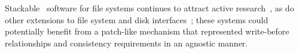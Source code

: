 


Stackable \module\ software for file systems continues to attract active
research~\cite{rosenthal90evolving, heidemann91layered, skinner93stacking,
heidemann94filesystem,zadok99extending,
zadok00fist,wright03ncryptfs,wright06versatility}, as do other extensions
to file system and disk interfaces~\cite{huang05fs2,sivathanu06typesafe};
these systems could potentially
benefit from a patch-like mechanism that represented write-before
relationships and consistency requirements in an agnostic manner.

\begin{comment}
Previous
systems like FiST~\cite{zadok00fist} or GEOM~\cite{geom} generally focus on
an individual portion of the system and thus restrict both what a \module\
can do and how \modules\ can be arranged. FiST, for instance, does not
provide a way to deal with structures on the disk directly -- it provides
only ``wrapper'' functionality around existing file
systems. %
GEOM, on the other hand, deals only with the block device layer, and has no
way to work with the file systems stored on those block devices. Neither
has a formal way of specifying or honoring complex write-ordering
information, which is what \patches\ in \Kudos\ provide. We imagine that
systems like these could be adapted to work with \patches, giving the
benefits of both ideas.

\paragraph{Applications}

A variety of extensions to file systems and disk interfaces have been proposed
in recent work, like the FS2 Free Space File System~\cite{huang05fs2},
encrypting file systems like NCryptfs~\cite{wright03ncryptfs}, and type-safe
disks~\cite{sivathanu06typesafe}. The \Kudos\
\module\ system may provide an interesting platform for implementations 
of these ideas.
\end{comment}


